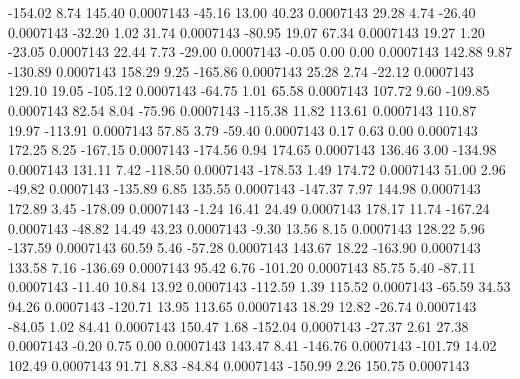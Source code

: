      -154.02        8.74      145.40     0.0007143
      -45.16       13.00       40.23     0.0007143
       29.28        4.74      -26.40     0.0007143
      -32.20        1.02       31.74     0.0007143
      -80.95       19.07       67.34     0.0007143
       19.27        1.20      -23.05     0.0007143
       22.44        7.73      -29.00     0.0007143
       -0.05        0.00        0.00     0.0007143
      142.88        9.87     -130.89     0.0007143
      158.29        9.25     -165.86     0.0007143
       25.28        2.74      -22.12     0.0007143
      129.10       19.05     -105.12     0.0007143
      -64.75        1.01       65.58     0.0007143
      107.72        9.60     -109.85     0.0007143
       82.54        8.04      -75.96     0.0007143
     -115.38       11.82      113.61     0.0007143
      110.87       19.97     -113.91     0.0007143
       57.85        3.79      -59.40     0.0007143
        0.17        0.63        0.00     0.0007143
      172.25        8.25     -167.15     0.0007143
     -174.56        0.94      174.65     0.0007143
      136.46        3.00     -134.98     0.0007143
      131.11        7.42     -118.50     0.0007143
     -178.53        1.49      174.72     0.0007143
       51.00        2.96      -49.82     0.0007143
     -135.89        6.85      135.55     0.0007143
     -147.37        7.97      144.98     0.0007143
      172.89        3.45     -178.09     0.0007143
       -1.24       16.41       24.49     0.0007143
      178.17       11.74     -167.24     0.0007143
      -48.82       14.49       43.23     0.0007143
       -9.30       13.56        8.15     0.0007143
      128.22        5.96     -137.59     0.0007143
       60.59        5.46      -57.28     0.0007143
      143.67       18.22     -163.90     0.0007143
      133.58        7.16     -136.69     0.0007143
       95.42        6.76     -101.20     0.0007143
       85.75        5.40      -87.11     0.0007143
      -11.40       10.84       13.92     0.0007143
     -112.59        1.39      115.52     0.0007143
      -65.59       34.53       94.26     0.0007143
     -120.71       13.95      113.65     0.0007143
       18.29       12.82      -26.74     0.0007143
      -84.05        1.02       84.41     0.0007143
      150.47        1.68     -152.04     0.0007143
      -27.37        2.61       27.38     0.0007143
       -0.20        0.75        0.00     0.0007143
      143.47        8.41     -146.76     0.0007143
     -101.79       14.02      102.49     0.0007143
       91.71        8.83      -84.84     0.0007143
     -150.99        2.26      150.75     0.0007143
